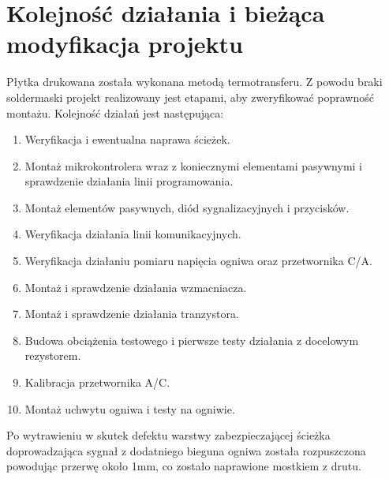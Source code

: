 \documentclass[polish,engineer]{polsl-msth}
\begin{document}
\section{Kolejność działania i bieżąca modyfikacja projektu\label{section:przerobki}}
Płytka drukowana została wykonana metodą termotransferu. Z powodu braki soldermaski projekt realizowany jest etapami, aby zweryfikować poprawność montażu. Kolejność działań jest następująca:
\begin{enumerate}
    \item Weryfikacja i ewentualna naprawa ścieżek.
    \item Montaż mikrokontrolera wraz z koniecznymi elementami pasywnymi i sprawdzenie działania linii programowania.
    \item Montaż elementów pasywnych, diód sygnalizacyjnych i przycisków.
    \item Weryfikacja działania linii komunikacyjnych.
    \item Weryfikacja działaniu pomiaru napięcia ogniwa oraz przetwornika C/A.
    \item Montaż i sprawdzenie działania wzmacniacza.
    \item Montaż i sprawdzenie działania tranzystora.
    \item Budowa obciążenia testowego i pierwsze testy działania z docelowym rezystorem.
    \item Kalibracja przetwornika A/C.
    \item Montaż uchwytu ogniwa i testy na ogniwie.
\end{enumerate}
Po wytrawieniu w skutek defektu warstwy zabezpieczającej ścieżka doprowadzająca sygnał z dodatniego bieguna ogniwa została rozpuszczona powodując przerwę około 1mm, co zostało naprawione mostkiem z drutu.
\end{document}
